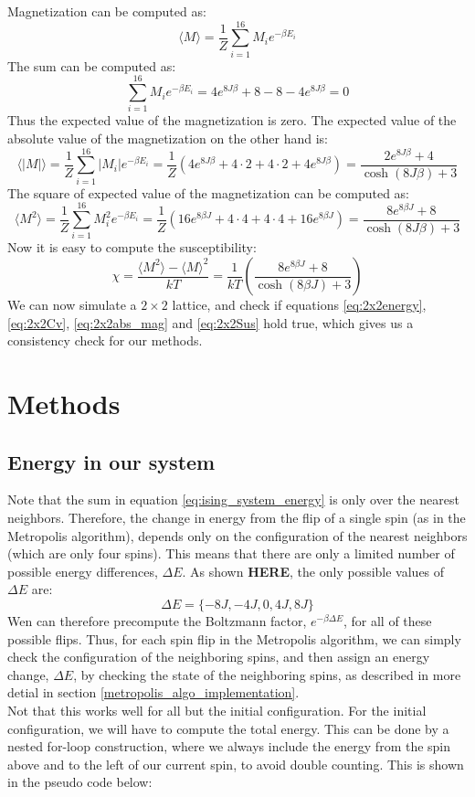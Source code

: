 \documentclass[a4paper, 10pt]{article}
\begin{document}
Magnetization can be computed as:
$$\langle M \rangle=\frac{1}{Z}\sum_{i=1}^{16}M_ie^{-\beta E_i}$$
The sum can be computed as:
$$\sum_{i=1}^{16}M_ie^{-\beta E_i}=4e^{8J\beta}+8-8-4e^{8J\beta}=0$$
Thus the expected value of the magnetization is zero. The expected value of the absolute value of the magnetization on the other hand is:
\begin{equation}\label{eq:2x2abs_mag}
\langle |M|\rangle =\frac{1}{Z}\sum_{i=1}^{16}|M_i|e^{-\beta E_i}=\frac{1}{Z}\left( 4e^{8J\beta}+4\cdot 2+ 4\cdot 2 +4e^{8J\beta}\right)=\frac{2e^{8J\beta}+4}{\cosh(8J\beta)+3}
\end{equation}
The square of expected value of the magnetization can be computed as:
$$\langle M^2 \rangle = \frac{1}{Z}\sum_{i=1}^{16}M_i^2e^{-\beta E_i}=\frac{1}{Z}\left(16e^{8\beta J}+4\cdot 4+4\cdot 4+16e^{8\beta J}\right)=\frac{8e^{8\beta J}+8}{\cosh(8J\beta)+3}$$
Now it is easy to compute the susceptibility:
\begin{equation}\label{eq:2x2Sus}
\chi = \frac{\langle M^2\rangle - \langle M \rangle^2}{kT}=\frac{1}{kT}\left(\frac{8e^{8\beta J}+8}{\cosh(8\beta J)+3}\right)
\end{equation}
We can now simulate a $2\times 2$ lattice, and check if equations \ref{eq:2x2energy}, \ref{eq:2x2Cv}, \ref{eq:2x2abs_mag} and \ref{eq:2x2Sus} hold true, which gives us a consistency check for our methods.
\section{Methods}
\subsection{Energy in our system}\label{energy_in_system}
Note that the sum in equation \ref{eq:ising_system_energy} is only over the nearest neighbors. Therefore, the change in energy from the flip of a single spin (as in the Metropolis algorithm), depends only on the configuration of the nearest neighbors (which are only four spins). This means that there are only a limited number of possible energy differences, $\Delta E$. As shown \textbf{HERE}, the only possible values of $\Delta E$ are:
$$\Delta E = \{ -8J, -4J, 0, 4J, 8J\}$$
Wen can therefore precompute the Boltzmann factor, $e^{-\beta \Delta E}$, for all of these possible flips. Thus, for each spin flip in the Metropolis algorithm, we can simply check the configuration of the neighboring spins, and then assign an energy change, $\Delta E$, by checking the state of the neighboring spins, as described in more detial in section \ref{metropolis_algo_implementation}.\\
\linebreak
Not that this works well for all but the initial configuration. For the initial configuration, we will have to compute the total energy. This can be done by a nested for-loop construction, where we always include the energy from the spin above and to the left of our current spin, to avoid double counting. This is shown in the pseudo code below:

\end{document}
